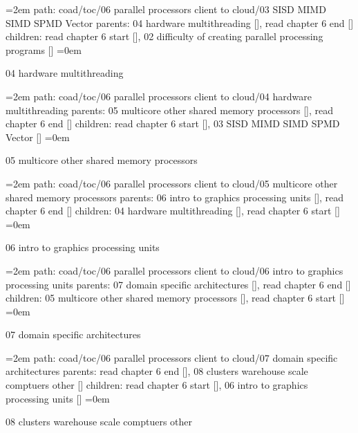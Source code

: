 \smallskip
\par\begingroup
\leftskip=2em
path: coad/toc/06 parallel processors client to cloud/03 SISD MIMD SIMD SPMD Vector
\smallskip
parents:  04 hardware multithreading [], read chapter 6 end []
\smallskip
children: read chapter 6 start [], 02 difficulty of creating parallel processing programs []
\smallskip
\leftskip=0em
\par\endgroup
\bigskip
{}
04 hardware multithreading
\smallskip
\par\begingroup
\leftskip=2em
path: coad/toc/06 parallel processors client to cloud/04 hardware multithreading
\smallskip
parents:  05 multicore other shared memory processors [], read chapter 6 end []
\smallskip
children: read chapter 6 start [], 03 SISD MIMD SIMD SPMD Vector []
\smallskip
\leftskip=0em
\par\endgroup
\bigskip
{}
05 multicore other shared memory processors
\smallskip
\par\begingroup
\leftskip=2em
path: coad/toc/06 parallel processors client to cloud/05 multicore other shared memory processors
\smallskip
parents:  06 intro to graphics processing units [], read chapter 6 end []
\smallskip
children: 04 hardware multithreading [], read chapter 6 start []
\smallskip
\leftskip=0em
\par\endgroup
\bigskip
{}
06 intro to graphics processing units
\smallskip
\par\begingroup
\leftskip=2em
path: coad/toc/06 parallel processors client to cloud/06 intro to graphics processing units
\smallskip
parents:  07 domain specific architectures [], read chapter 6 end []
\smallskip
children: 05 multicore other shared memory processors [], read chapter 6 start []
\smallskip
\leftskip=0em
\par\endgroup
\bigskip
{}
07 domain specific architectures
\smallskip
\par\begingroup
\leftskip=2em
path: coad/toc/06 parallel processors client to cloud/07 domain specific architectures
\smallskip
parents:  read chapter 6 end [], 08 clusters warehouse scale comptuers other []
\smallskip
children: read chapter 6 start [], 06 intro to graphics processing units []
\smallskip
\leftskip=0em
\par\endgroup
\bigskip
{}
08 clusters warehouse scale comptuers other
